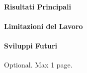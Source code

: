 \documentclass[12pt,a4paper,openright,twoside]{book}
\begin{document}
\paragraph{Risultati Principali}

\paragraph{Limitazioni del Lavoro}

\paragraph{Sviluppi Futuri}

\backmatter

\nocite{*}




\begin{acknowledgements}
   Optional. Max 1 page.
\end{acknowledgements}
\end{document}
